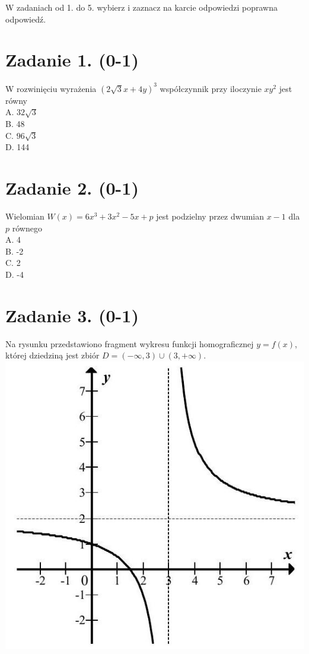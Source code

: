 \documentclass[10pt]{article}
\begin{document}
W zadaniach od 1. do 5. wybierz i zaznacz na karcie odpowiedzi poprawna odpowiedź.

\section*{Zadanie 1. (0-1)}
W rozwinięciu wyrażenia \((2 \sqrt{3} x+4 y)^{3}\) współczynnik przy iloczynie \(x y^{2}\) jest równy\\
A. \(32 \sqrt{3}\)\\
B. 48\\
C. \(96 \sqrt{3}\)\\
D. 144

\section*{Zadanie 2. (0-1)}
Wielomian \(W(x)=6 x^{3}+3 x^{2}-5 x+p\) jest podzielny przez dwumian \(x-1\) dla \(p\) równego\\
A. 4\\
B. -2\\
C. 2\\
D. -4

\section*{Zadanie 3. (0-1)}
Na rysunku przedstawiono fragment wykresu funkcji homograficznej \(y=f(x)\), której dziedziną jest zbiór \(D=(-\infty, 3) \cup(3,+\infty)\).\\
\includegraphics[max width=\textwidth, center]{2024_11_21_054c332d5c02f869c372g-02}
\end{document}
